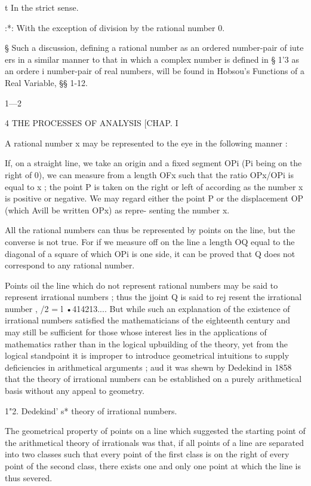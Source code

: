t In the strict sense. 

:*: With the exception of division by tbe rational number 0. 

§ Such a discussion, defining a rational number as an ordered number-pair of iute ers in a 
similar manner to that in which a complex number is defined in § 1'3 as an ordere i number-pair 
of real numbers, will be found in Hobsou's Functions of a Real Variable, §§ 1-12. 

1—2 



4 THE PROCESSES OF ANALYSIS [CHAP. I 

A rational number x may be represented to the eye in the following 
manner : 

If, on a straight line, we take an origin and a fixed segment OPi 
(Pi being on the right of 0), we can measure from a length OFx such that 
the ratio OPx/OPi is equal to x ; the point P  is taken on the right or left of 
according as the number x is positive or negative. We may regard either 
the point P  or the displacement OP  (which Avill be written OPx) as repre- 
senting the number x. 

All the rational numbers can thus be represented by points on the line, 
but the converse is not true. For if we measure off on the line a length OQ 
equal to the diagonal of a square of which OPi is one side, it can be proved 
that Q does not correspond to any rational number. 

Points oil the line which do not represent rational numbers may be said to represent 
irrational numbers ; thus the jjoint Q is said to rej resent the irrational number 
, /2 = l •414213.... But while such an explanation of the existence of irrational numbers 
satisfied the mathematicians of the eighteenth century and may still be sufficient for 
those whose interest lies in the applications of mathematics rather than in the logical 
upbuilding of the theory, yet from the logical standpoint it is improper to introduce 
geometrical intuitions to supply deficiencies in arithmetical arguments ; aud it was 
shewn by Dedekind in 1858 that the theory of irrational numbers can be established on 
a purely arithmetical basis without any appeal to geometry. 

1"2. Dedekind' s* theory of irrational numbers. 

The geometrical property of points on a line which suggested the starting 
point of the arithmetical theory of irrationals was that, if all points of a line 
are separated into two classes such that every point of the first class is on 
the right of every point of the second class, there exists one and only one 
point at which the line is thus severed. 

